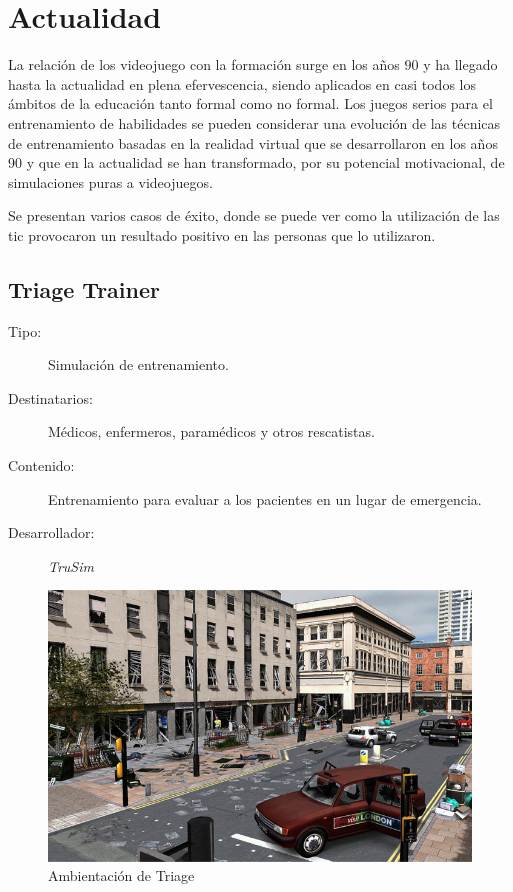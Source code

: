 \section{Actualidad}

La relación de los videojuego con la formación surge en los años $90$ y ha llegado hasta la
actualidad en plena efervescencia, siendo aplicados en casi todos los ámbitos de
la educación tanto formal como no formal. Los juegos serios para el entrenamiento 
de habilidades se pueden considerar una evolución de las técnicas de entrenamiento 
basadas en la realidad virtual que se desarrollaron en los años 90 y que en la actualidad se han
transformado, por su potencial motivacional, de simulaciones puras a
videojuegos\cite{videojuegos:gonzaleztardon}.


Se presentan varios casos de éxito, donde se puede ver como la utilización de
las \Gls{tic} provocaron un resultado positivo en las personas que lo
utilizaron.

\subsection{Triage Trainer}
	

\begin{description}
\item[Tipo:] Simulación de entrenamiento.
\item[Destinatarios:] Médicos, enfermeros, paramédicos y otros rescatistas.
\item[Contenido:] Entrenamiento para evaluar a los pacientes en un lugar de
    emergencia.
\item[Desarrollador:] \emph{TruSim}
\end{description}

\begin{figure}[ht!] 
\centering 
\includegraphics[scale=0.5]{tics/images/triage.png}
\caption{Ambientación de Triage}
\label{fig:triage}
\end{figure}

